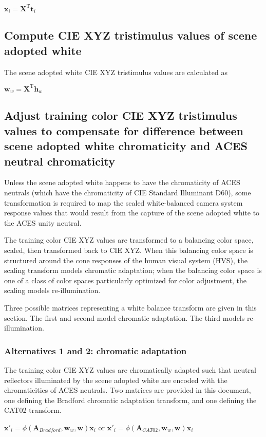 $\mathbf{x}_i=\mathbf{X}^{\mathrm{T}}\mathbf{t}_i$

\subsection{Compute CIE XYZ tristimulus values of scene adopted white}
The scene adopted white CIE XYZ tristimulus values are calculated as 

$\mathbf{w}_w=\mathbf{X}^{\mathrm{T}}\mathbf{h}_w$

\subsection{Adjust training color CIE XYZ tristimulus values to compensate for difference between scene adopted white chromaticity and ACES neutral chromaticity}
\label{sec:chromaticadaptation}
Unless the scene adopted white happens to have the chromaticity of ACES neutrals (which have the chromaticity of CIE Standard Illuminant D60), some transformation is required to map the scaled white-balanced camera system response values that would result from the capture of the scene adopted white to the ACES unity neutral.

The training color CIE XYZ values are transformed to a balancing color space, scaled, then transformed back to CIE XYZ. When this balancing color space is structured around the cone responses of the human visual system (HVS), the scaling transform models chromatic adaptation; when the balancing color space is one of a class of color spaces particularly optimized for color adjustment, the scaling models re-illumination.


Three possible matrices representing a white balance transform are given in this section. The first and second model chromatic adaptation. The third models re-illumination.

\subsubsection{Alternatives 1 and 2: chromatic adaptation}
The training color CIE XYZ values are chromatically adapted such that neutral reflectors illuminated by the scene adopted white are encoded with the chromaticities of ACES neutrals. Two matrices are provided in this document, one defining the Bradford chromatic adaptation transform, and one defining the CAT02 transform.

$\mathbf{x}'_i = \phi(\mathbf{A}_{Bradford},\mathbf{w}_w,\mathbf{w})\mathbf{x}_i$ or $\mathbf{x}'_i = \phi(\mathbf{A}_{\mathit{CAT02}},\mathbf{w}_w,\mathbf{w})\mathbf{x}_i$


